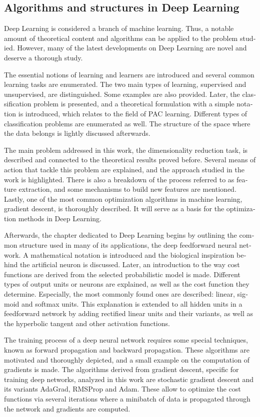 \begin{otherlanguage}{american}
\section*{Algorithms and structures in Deep Learning}

Deep Learning is considered a branch of machine learning. Thus, a notable amount of theoretical content and algorithms can be applied to the problem studied. However, many of the latest developments on Deep Learning are novel and deserve a thorough study.

The essential notions of learning and learners are introduced and several common learning tasks are enumerated. The two main types of learning, supervised and unsupervised, are distinguished. Some examples are also provided. Later, the classification problem is presented, and a theoretical formulation with a simple notation is introduced, which relates to the field of PAC learning. Different types of classification problems are enumerated as well. The structure of the space where the data belongs is lightly discussed afterwards.

The main problem addressed in this work, the dimensionality reduction task, is described and connected to the theoretical results proved before. Several means of action that tackle this problem are explained, and the approach studied in the work is highlighted. There is also a breakdown of the process referred to as feature extraction, and some mechanisms to build new features are mentioned. Lastly, one of the most common optimization algorithms in machine learning, gradient descent, is thoroughly described. It will serve as a basis for the optimization methods in Deep Learning.

Afterwards, the chapter dedicated to Deep Learning begins by outlining the common structure used in many of its applications, the deep feedforward neural network. A mathematical notation is introduced and the biological inspiration behind the artificial neuron is discussed. Later, an introduction to the way cost functions are derived from the selected probabilistic model is made. Different types of output units or neurons are explained, as well as the cost function they determine. Especially, the most commonly found ones are described: linear, sigmoid and softmax units. This explanation is extended to all hidden units in a feedforward network by adding rectified linear units and their variants, as well as the hyperbolic tangent and other activation functions.

The training process of a deep neural network requires some special techniques, known as forward propagation and backward propagation. These algorithms are motivated and thoroughly depicted, and a small example on the computation of gradients is made. The algorithms derived from gradient descent, specific for training deep networks, analyzed in this work are stochastic gradient descent and its variants AdaGrad, RMSProp and Adam. These allow to optimize the cost functions via several iterations where a minibatch of data is propagated through the network and gradients are computed.


\end{otherlanguage}
